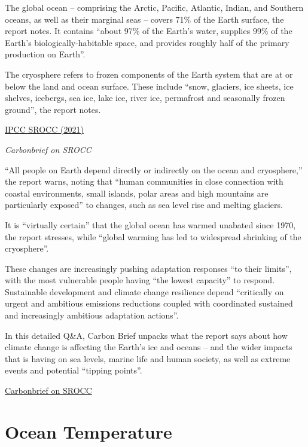 \documentclass[
]{book}
\begin{document}
The global ocean -- comprising the Arctic, Pacific, Atlantic, Indian, and Southern oceans, as well as their marginal seas -- covers 71\% of the Earth surface, the report notes. It contains ``about 97\% of the Earth's water, supplies 99\% of the Earth's biologically-habitable space, and provides roughly half of the primary production on Earth''.

The cryosphere refers to frozen components of the Earth system that are at or below the land and ocean surface. These include ``snow, glaciers, ice sheets, ice shelves, icebergs, sea ice, lake ice, river ice, permafrost and seasonally frozen ground'', the report notes.

\href{https://www.ipcc.ch/srocc/}{IPCC SROCC (2021)}

\emph{Carbonbrief on SROCC}

``All people on Earth depend directly or indirectly on the ocean and cryosphere,'' the report warns, noting that ``human communities in close connection with coastal environments, small islands, polar areas and high mountains are particularly exposed'' to changes, such as sea level rise and melting glaciers.

It is ``virtually certain'' that the global ocean has warmed unabated since 1970, the report stresses, while ``global warming has led to widespread shrinking of the cryosphere''.

These changes are increasingly pushing adaptation responses ``to their limits'', with the most vulnerable people having ``the lowest capacity'' to respond. Sustainable development and climate change resilience depend ``critically on urgent and ambitious emissions reductions coupled with coordinated sustained and increasingly ambitious adaptation actions''.

In this detailed Q\&A, Carbon Brief unpacks what the report says about how climate change is affecting the Earth's ice and oceans -- and the wider impacts that is having on sea levels, marine life and human society, as well as extreme events and potential ``tipping points''.

\href{https://www.carbonbrief.org/in-depth-qa-the-ipccs-special-report-on-the-ocean-and-cryosphere}{Carbonbrief on SROCC}

\hypertarget{ocean-temperature}{%
\section{Ocean Temperature}\label{ocean-temperature}}
\end{document}
